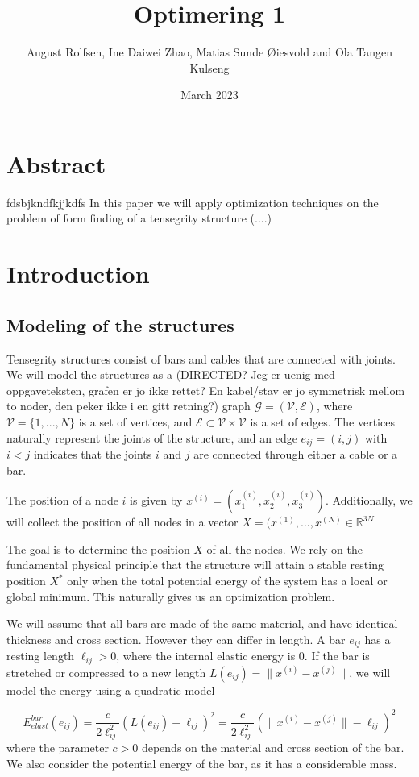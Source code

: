 \documentclass[11pt]{article}
\title{\vspace{-2em} Optimering 1\vspace{-1em}}
\author{August Rolfsen, Ine Daiwei Zhao, Matias Sunde Øiesvold and Ola Tangen Kulseng}
\date{\vspace{-1em}March 2023\vspace{-2em}}
\newcommand{\el}{\ell_{ij}}
\newcommand{\xnorm}{\lVert x^{(i)} - x^{(j)}\rVert}
\newcommand{\e}{(e_{ij})}
\newcommand{\ebe}{E^{bar}_{elast}(e_{ij})}
\begin{document}
\maketitle
\section{Abstract}
fdsbjkndfkjjkdfs
In this paper we will apply optimization techniques on the problem of form finding of a tensegrity structure (....)

\section{Introduction}
\subsection{Modeling of the structures}
Tensegrity structures consist of bars and cables that are connected with joints. We will model the structures as a (DIRECTED? Jeg er uenig med oppgaveteksten, grafen er jo ikke rettet? En kabel/stav er jo symmetrisk mellom to noder, den peker ikke i en gitt retning?) graph $\mathcal{G} = (\mathcal{V},\mathcal{E})$, where $\mathcal{V} = \{1,...,N\}$ is a set of vertices, and $\mathcal{E} \subset \mathcal{V} \times \mathcal{V}$ is a set of edges. The vertices naturally represent the joints of the structure, and an edge $e_{ij} = (i,j)$ with $i < j$ indicates that the joints $i$ and $j$ are connected through either a cable or a bar.

The position of a node $i$ is given by $x^{(i)} = (x_1^{(i)},x_2^{(i)},x_3^{(i)})$. Additionally, we will collect the position of all nodes in a vector $X = (x^{(1)},...,x^{(N)} \in \mathbb{R}^{3N}$

The goal is to determine the position $X$ of all the nodes. We rely on the fundamental physical principle that the structure will attain a stable resting position $X^*$ only when the total potential energy of the system has a local or global minimum. This naturally gives us an optimization problem.

We will assume that all bars are made of the same material, and have identical thickness and cross section. However they can differ in length. A bar $e_{ij}$ has a resting length $\ell_{ij}>0$, where the internal elastic energy is $0$. If the bar is stretched or compressed to a new length $L(e_{ij})=\lVert x^{(i)} - x^{(j)}\rVert$, we will model the energy using a quadratic model


\begin{equation}
    \ebe = \frac{c}{2\el^2}(L\e - \el)^2 = \frac{c}{2 \el^2}(\xnorm - \el)^2
    \label{barElast}
\end{equation}
where the parameter $c > 0$ depends on the material and cross section of the bar. We also consider the potential energy of the bar, as it has a considerable mass.
\end{document}
